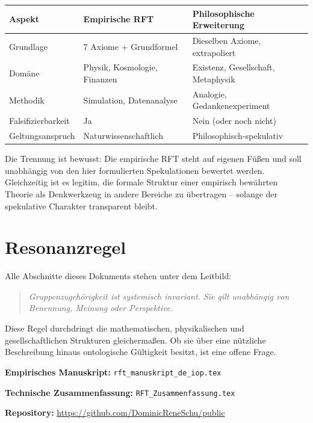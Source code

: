 \documentclass[a4paper,11pt]{article}
\begin{document}
	\begin{center}
		\begin{tabular}{lll}
			\hline
			\textbf{Aspekt} & \textbf{Empirische RFT}
			& \textbf{Philosophische Erweiterung} \\
			\hline
			Grundlage & 7 Axiome + Grundformel
			& Dieselben Axiome, extrapoliert \\
			Dom\"ane & Physik, Kosmologie, Finanzen
			& Existenz, Gesellschaft, Metaphysik \\
			Methodik & Simulation, Datenanalyse
			& Analogie, Gedankenexperiment \\
			Falsifizierbarkeit & Ja
			& Nein (oder noch nicht) \\
			Geltungsanspruch & Naturwissenschaftlich
			& Philosophisch-spekulativ \\
			\hline
		\end{tabular}
	\end{center}
	
	\medskip
	
	Die Trennung ist bewusst: Die empirische RFT steht
	auf eigenen F\"u\ss{}en und soll unabh\"angig von den
	hier formulierten Spekulationen bewertet werden.
	Gleichzeitig ist es legitim, die formale Struktur
	einer empirisch bew\"ahrten Theorie als Denkwerkzeug
	in andere Bereiche zu \"ubertragen -- solange der
	spekulative Charakter transparent bleibt.
	
	\section*{Resonanzregel}
	
	Alle Abschnitte dieses Dokuments stehen unter dem
	Leitbild:
	
	\begin{quote}
		\textit{Gruppenzugeh\"origkeit ist systemisch invariant.
			Sie gilt unabh\"angig von Benennung, Meinung oder
			Perspektive.}
	\end{quote}
	
	Diese Regel durchdringt die mathematischen, physikalischen
	und gesellschaftlichen Strukturen gleicherma\ss{}en. Ob sie
	\"uber eine n\"utzliche Beschreibung hinaus ontologische
	G\"ultigkeit besitzt, ist eine offene Frage.
	
	\vspace{2em}
	
	\textbf{Empirisches Manuskript:}
	\texttt{rft\_manuskript\_de\_iop.tex}
	
	\textbf{Technische Zusammenfassung:}
	\texttt{RFT\_Zusammenfassung.tex}
	
	\textbf{Repository:}
	\url{https://github.com/DominicReneSchu/public}
	\hfill
	
\end{document}
